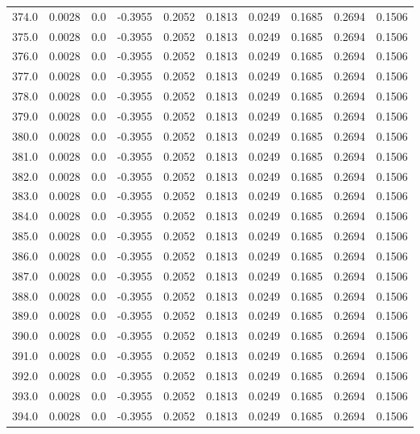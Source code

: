 \begin{longtable}{lrrrrrrrrr}
374.0 & 0.0028 & 0.0 & -0.3955 & 0.2052 & 0.1813 & 0.0249 & 0.1685 & 0.2694 & 0.1506 \\
375.0 & 0.0028 & 0.0 & -0.3955 & 0.2052 & 0.1813 & 0.0249 & 0.1685 & 0.2694 & 0.1506 \\
376.0 & 0.0028 & 0.0 & -0.3955 & 0.2052 & 0.1813 & 0.0249 & 0.1685 & 0.2694 & 0.1506 \\
377.0 & 0.0028 & 0.0 & -0.3955 & 0.2052 & 0.1813 & 0.0249 & 0.1685 & 0.2694 & 0.1506 \\
378.0 & 0.0028 & 0.0 & -0.3955 & 0.2052 & 0.1813 & 0.0249 & 0.1685 & 0.2694 & 0.1506 \\
379.0 & 0.0028 & 0.0 & -0.3955 & 0.2052 & 0.1813 & 0.0249 & 0.1685 & 0.2694 & 0.1506 \\
380.0 & 0.0028 & 0.0 & -0.3955 & 0.2052 & 0.1813 & 0.0249 & 0.1685 & 0.2694 & 0.1506 \\
381.0 & 0.0028 & 0.0 & -0.3955 & 0.2052 & 0.1813 & 0.0249 & 0.1685 & 0.2694 & 0.1506 \\
382.0 & 0.0028 & 0.0 & -0.3955 & 0.2052 & 0.1813 & 0.0249 & 0.1685 & 0.2694 & 0.1506 \\
383.0 & 0.0028 & 0.0 & -0.3955 & 0.2052 & 0.1813 & 0.0249 & 0.1685 & 0.2694 & 0.1506 \\
384.0 & 0.0028 & 0.0 & -0.3955 & 0.2052 & 0.1813 & 0.0249 & 0.1685 & 0.2694 & 0.1506 \\
385.0 & 0.0028 & 0.0 & -0.3955 & 0.2052 & 0.1813 & 0.0249 & 0.1685 & 0.2694 & 0.1506 \\
386.0 & 0.0028 & 0.0 & -0.3955 & 0.2052 & 0.1813 & 0.0249 & 0.1685 & 0.2694 & 0.1506 \\
387.0 & 0.0028 & 0.0 & -0.3955 & 0.2052 & 0.1813 & 0.0249 & 0.1685 & 0.2694 & 0.1506 \\
388.0 & 0.0028 & 0.0 & -0.3955 & 0.2052 & 0.1813 & 0.0249 & 0.1685 & 0.2694 & 0.1506 \\
389.0 & 0.0028 & 0.0 & -0.3955 & 0.2052 & 0.1813 & 0.0249 & 0.1685 & 0.2694 & 0.1506 \\
390.0 & 0.0028 & 0.0 & -0.3955 & 0.2052 & 0.1813 & 0.0249 & 0.1685 & 0.2694 & 0.1506 \\
391.0 & 0.0028 & 0.0 & -0.3955 & 0.2052 & 0.1813 & 0.0249 & 0.1685 & 0.2694 & 0.1506 \\
392.0 & 0.0028 & 0.0 & -0.3955 & 0.2052 & 0.1813 & 0.0249 & 0.1685 & 0.2694 & 0.1506 \\
393.0 & 0.0028 & 0.0 & -0.3955 & 0.2052 & 0.1813 & 0.0249 & 0.1685 & 0.2694 & 0.1506 \\
394.0 & 0.0028 & 0.0 & -0.3955 & 0.2052 & 0.1813 & 0.0249 & 0.1685 & 0.2694 & 0.1506 \\

\end{longtable}
